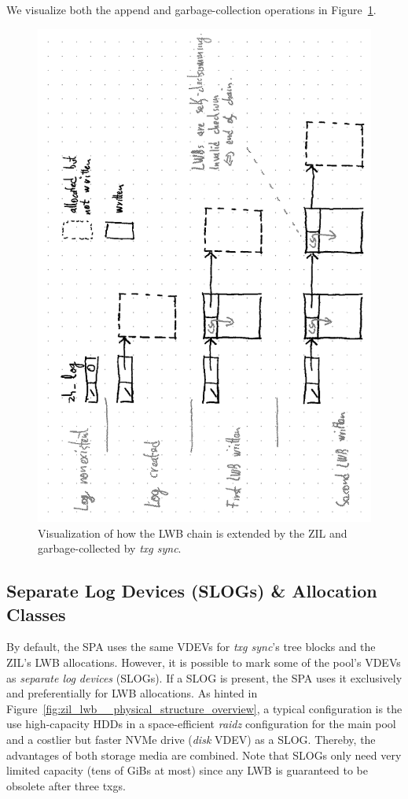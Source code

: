 \documentclass[12pt,a4paper,twoside]{book}
\begin{document}
{We visualize both the append and garbage-collection operations in Figure~\ref{fig:zil_lwb__physical_structure_append}.

\begin{figure}[H]
    \centering
    \includegraphics{fig/zil_lwb__physical_structure_append}
    \caption{Visualization of how the LWB chain is extended by the ZIL and garbage-collected by \textit{txg sync}.
    }
    \label{fig:zil_lwb__physical_structure_append}
\end{figure}

\subsection{Separate Log Devices (SLOGs) \& Allocation Classes}

By default, the SPA uses the same VDEVs for \textit{txg sync}'s tree blocks and the ZIL's LWB allocations.
However, it is possible to mark some of the pool's VDEVs as \textit{separate log devices} (SLOGs).
If a SLOG is present, the SPA uses it exclusively and preferentially for LWB allocations.
As hinted in Figure~\ref{fig:zil_lwb__physical_structure_overview}, a typical configuration is the use high-capacity HDDs in a space-efficient \textit{raidz} configuration for the main pool and a costlier but faster NVMe drive (\textit{disk} VDEV) as a SLOG.
Thereby, the advantages of both storage media are combined.
Note that SLOGs only need very limited capacity (tens of GiBs at most) since any LWB is guaranteed to be obsolete after three txgs.

}
\end{document}
